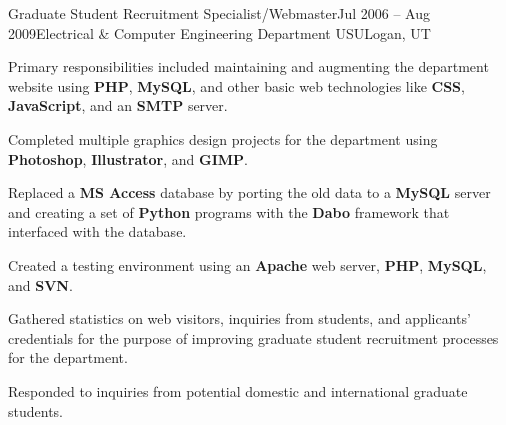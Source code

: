 
\def\PositionTitle{Graduate Student Recruitment Specialist/Webmaster}
\def\PositionPeriod{Jul 2006 -- Aug 2009} %
\def\OrgName{Electrical \& Computer Engineering Department USU}
\def\OrgLocation{Logan, UT}


\begin{rExperience}{\PositionTitle}{\PositionPeriod}{\OrgName}{\OrgLocation}

  \item Primary responsibilities included maintaining and augmenting the department website using \textbf{PHP}, \textbf{MySQL}, and other basic web technologies like \textbf{CSS}, \textbf{JavaScript}, and an \textbf{SMTP} server.

  \item Completed multiple graphics design projects for the department using \textbf{Photoshop}, \textbf{Illustrator}, and \textbf{GIMP}.

  \begin{CVonly}

  \item Replaced a \textbf{MS Access} database by porting the old data to a \textbf{MySQL} server and creating a set of \textbf{Python} programs with the \textbf{Dabo} framework that interfaced with the database.


  \item Created a testing environment using an \textbf{Apache} web server, \textbf{PHP}, \textbf{MySQL}, and \textbf{SVN}.

  \item Gathered statistics on web visitors, inquiries from students, and applicants' credentials for the purpose of improving graduate student recruitment processes for the department.

  \item Responded to inquiries from potential domestic and international graduate students.

  \end{CVonly}

\end{rExperience}
